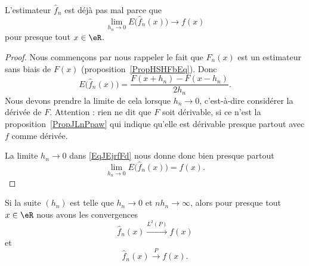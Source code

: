 \begin{lemma}   \label{LemTZopXDd}
    L'estimateur \( \hat f_n\) est déjà pas mal parce que
    \begin{equation}
        \lim_{h_n\to 0} E\big( \hat f_n(x) \big)\to f(x)
    \end{equation}
    pour presque tout \( x\in \eR\).
\end{lemma}

\begin{proof}
    Nous commençons par nous rappeler le fait que \( F_n(x)\) est un estimateur sans biais de \( F(x)\) (proposition~\ref{PropHSHFbEq}). Donc
    \begin{equation}    \label{EqJEjrfFd}
        E\big( \hat f_n(x) \big)=\frac{ F(x+h_n)-F(x-h_n) }{ 2h_n }.
    \end{equation}
    Nous devons prendre la limite de cela lorsque \( h_n\to 0\), c'est-à-dire considérer la dérivée de \( F\). Attention : rien ne dit que \( F\) soit dérivable, si ce n'est la proposition~\ref{PropJLnPpaw} qui indique qu'elle est dérivable presque partout avec \( f\) comme dérivée.

    La limite \( h_n\to 0\) dans \eqref{EqJEjrfFd} nous donne donc bien presque partout
    \begin{equation}
        \lim_{h_n\to 0} E\big( \hat f_n(x) \big)=f(x).
    \end{equation}
\end{proof}

\begin{proposition}
    Si la suite \( (h_n)\) est telle que \( h_n\to 0\) et \( nh_n\to \infty\), alors pour presque tout \( x\in \eR\) nous avons les convergences
    \begin{equation}
        \hat f_n(x)\stackrel{L^2(P)}{\to}f(x)
    \end{equation}
    et
    \begin{equation}
        \hat f_n(x)\stackrel{P}{\to}f(x).
    \end{equation}
\end{proposition}

